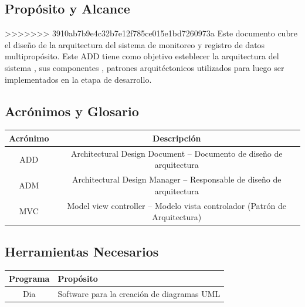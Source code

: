 \subsection{\textcolor[gray]{.2}{Propósito y Alcance}}
>>>>>>> 3910ab7b9e4c32b7e12f785ce015e1bd7260973a
Este documento cubre el diseño de la arquitectura  del sistema
de monitoreo y registro de datos multipropósito. Este ADD tiene como objetivo
esteblecer la arquitectura del sistema , sus componentes , patrones
arquitéctonicos utilizados para luego ser implementados en la etapa de desarrollo.

\subsection{\textcolor[gray]{.2}{Acrónimos y Glosario}}
\begin{table}[!h]
\begin{center}
\begin{tabular}{|c|c|}
\hline
\rowcolor[gray]{.8} Acrónimo & Descripción \\
\hline
ADD & Architectural Design Document – Documento de diseño de arquitectura\\
\hline
ADM & Architectural Design Manager – Responsable de diseño de arquitectura\\
\hline
MVC & Model view controller – Modelo vista controlador (Patrón de
Arquitectura)\\
\hline
\end{tabular}
\end{center}
\end{table}

\subsection{\textcolor[gray]{.2}{Herramientas Necesarios}}
\begin{table}[!h]
\begin{center}
\begin{tabular}{|c|p{100mm}|}
\hline
\rowcolor[gray]{.8} Programa & Propósito \\
\hline
Dia & Software para la creación de diagramas UML \\
\hline
\end{tabular}
\end{center}
\end{table}

